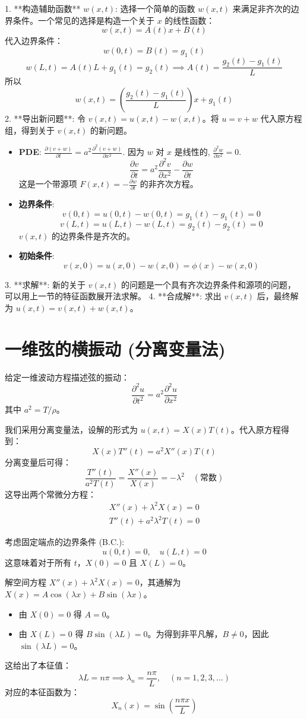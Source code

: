 \documentclass{article}
\begin{document}
	1.  **构造辅助函数** $w(x,t)$: 选择一个简单的函数 $w(x,t)$ 来满足非齐次的边界条件。一个常见的选择是构造一个关于 $x$ 的线性函数：
	$$
	w(x,t) = A(t)x + B(t)
	$$
	代入边界条件：
	$$
	w(0,t) = B(t) = g_1(t)
	$$
	$$
	w(L,t) = A(t)L + g_1(t) = g_2(t) \implies A(t) = \frac{g_2(t)-g_1(t)}{L}
	$$
	所以
	$$
	w(x,t) = \left(\frac{g_2(t)-g_1(t)}{L}\right)x + g_1(t)
	$$
	2.  **导出新问题**: 令 $v(x,t) = u(x,t) - w(x,t)$。将 $u=v+w$ 代入原方程组，得到关于 $v(x,t)$ 的新问题。
	\begin{itemize}
		\item \textbf{PDE}:
		$\frac{\partial (v+w)}{\partial t} = a^2 \frac{\partial^2 (v+w)}{\partial x^2}$.
		因为 $w$ 对 $x$ 是线性的, $\frac{\partial^2 w}{\partial x^2} = 0$.
		$$
		\frac{\partial v}{\partial t} = a^2 \frac{\partial^2 v}{\partial x^2} - \frac{\partial w}{\partial t}
		$$
		这是一个带源项 $F(x,t) = -\frac{\partial w}{\partial t}$ 的非齐次方程。
		\item \textbf{边界条件}:
		$$
		v(0,t) = u(0,t) - w(0,t) = g_1(t) - g_1(t) = 0
		$$
		$$
		v(L,t) = u(L,t) - w(L,t) = g_2(t) - g_2(t) = 0
		$$
		$v(x,t)$ 的边界条件是齐次的。
		\item \textbf{初始条件}:
		$$
		v(x,0) = u(x,0) - w(x,0) = \phi(x) - w(x,0)
		$$
	\end{itemize}
	3.  **求解**: 新的关于 $v(x,t)$ 的问题是一个具有齐次边界条件和源项的问题，可以用上一节的特征函数展开法求解。
	4.  **合成解**: 求出 $v(x,t)$ 后，最终解为 $u(x,t) = v(x,t) + w(x,t)$。
	\section{一维弦的横振动 (分离变量法)}
	
	给定一维波动方程描述弦的振动：
	$$ \frac{\partial^2 u}{\partial t^2} = a^2 \frac{\partial^2 u}{\partial x^2} $$
	其中 $a^2 = T/\rho$。
	
	我们采用分离变量法，设解的形式为 $u(x,t) = X(x)T(t)$。代入原方程得到：
	$$ X(x)T''(t) = a^2 X''(x)T(t) $$
	分离变量后可得：
	$$ \frac{T''(t)}{a^2 T(t)} = \frac{X''(x)}{X(x)} = - \lambda^2 \quad (\text{常数}) $$
	这导出两个常微分方程：
	\begin{gather*}
		X''(x) + \lambda^2 X(x) = 0 \\
		T''(t) + a^2 \lambda^2 T(t) = 0
	\end{gather*}
	
	考虑固定端点的边界条件 (B.C.):
	$$ u(0,t) = 0, \quad u(L,t) = 0 $$
	这意味着对于所有 $t$，$X(0)=0$ 且 $X(L)=0$。
	
	解空间方程 $X''(x) + \lambda^2 X(x) = 0$，其通解为 $X(x) = A\cos(\lambda x) + B\sin(\lambda x)$。
	\begin{itemize}
		\item 由 $X(0) = 0$ 得 $A=0$。
		\item 由 $X(L) = 0$ 得 $B\sin(\lambda L) = 0$。为得到非平凡解，$B \neq 0$，因此 $\sin(\lambda L) = 0$。
	\end{itemize}
	这给出了本征值：
	$$ \lambda L = n\pi \implies \lambda_n = \frac{n\pi}{L}, \quad (n=1, 2, 3, \dots) $$
	对应的本征函数为：
	$$ X_n(x) = \sin\left(\frac{n\pi x}{L}\right) $$
	
\end{document}
